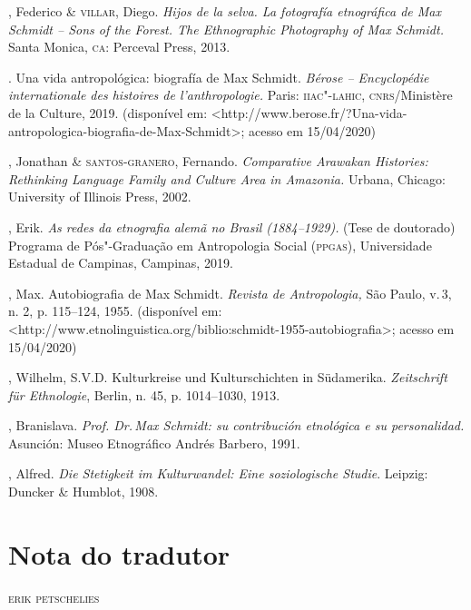 \begin{bibliohedra}
, Federico \& \textsc{villar}, Diego. \emph{Hijos de la selva. La
fotografía etnográfica de Max Schmidt -- Sons of the Forest. The
Ethnographic Photography of Max Schmidt.} Santa Monica, \textsc{ca}: Perceval
Press, 2013.

\titidem. Una vida antropológica: biografía de Max Schmidt.
\emph{Bérose -- Encyclopédie internationale des histoires de
l'anthropologie.} Paris: \textsc{iiac"-lahic}, \textsc{cnrs}/Ministère de la Culture, 2019.
(disponível em:
\textless{}http://www.berose.fr/?Una-vida-antropologica-biografia-de-Max-Schmidt\textgreater{};
acesso em 15/04/2020)

, Jonathan \& \textsc{santos-granero}, Fernando. \emph{Comparative
Arawakan Histories: Rethinking Language Family and Culture Area in
Amazonia\emph{.}} Urbana, Chicago: University of Illinois Press, 2002.

, Erik. \emph{As redes da etnografia alemã no Brasil
(1884--1929).} (Tese de doutorado) Programa de Pós"-Graduação em
Antropologia Social (\textsc{ppgas}), Universidade Estadual de Campinas,
Campinas, 2019.

, Max. Autobiografia de Max Schmidt. \emph{Revista de
Antropologia,} São Paulo, v.\,3, n. 2, p. 115--124, 1955. (disponível em:
\textless{}http://www.etnolinguistica.org/biblio:schmidt-1955-autobiografia\textgreater{};
acesso em 15/04/2020)

, Wilhelm, S.V.D. Kulturkreise und Kulturschichten in Südamerika.
\emph{Zeitschrift für Ethnologie}, Berlin, n. 45, p. 1014--1030,
1913.

, Branislava. \emph{Prof. Dr.\,Max Schmidt: su contribución
etnológica e su personalidad.} Asunción: Museo Etnográfico Andrés
Barbero, 1991.

, Alfred. \emph{Die Stetigkeit im Kulturwandel: Eine
soziologische Studie}. Leipzig: Duncker \& Humblot, 1908.
\end{bibliohedra}

\chapter[Nota do tradutor, \emph{por Erik Petschelies}]{Nota do tradutor}

\begin{flushright}
\textsc{erik petschelies}\medskip
\end{flushright}

